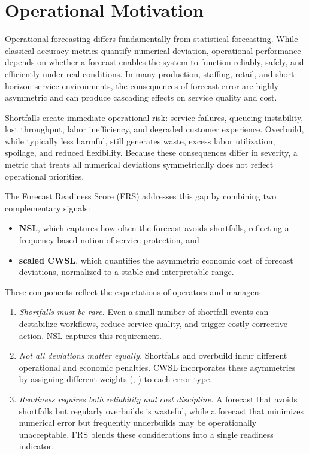 \section{Operational Motivation}

Operational forecasting differs fundamentally from statistical forecasting. While
classical accuracy metrics quantify numerical deviation, operational performance
depends on whether a forecast enables the system to function reliably, safely, and
efficiently under real conditions. In many production, staffing, retail, and
short-horizon service environments, the consequences of forecast error are highly
asymmetric and can produce cascading effects on service quality and cost.

Shortfalls create immediate operational risk: service failures, queueing
instability, lost throughput, labor inefficiency, and degraded customer
experience. Overbuild, while typically less harmful, still generates waste,
excess labor utilization, spoilage, and reduced flexibility. Because these
consequences differ in severity, a metric that treats all numerical deviations
symmetrically does not reflect operational priorities.

The Forecast Readiness Score (FRS) addresses this gap by combining two
complementary signals:

\begin{itemize}
    \item \textbf{NSL}, which captures how often the forecast avoids shortfalls,
    reflecting a frequency-based notion of service protection, and
    \item \textbf{scaled CWSL}, which quantifies the asymmetric economic cost of
    forecast deviations, normalized to a stable and interpretable range.
\end{itemize}

These components reflect the expectations of operators and managers:

\begin{enumerate}
    \item \textit{Shortfalls must be rare.} Even a small number of shortfall
    events can destabilize workflows, reduce service quality, and trigger costly
    corrective action. NSL captures this requirement.

    \item \textit{Not all deviations matter equally.} Shortfalls and overbuild
    incur different operational and economic penalties. CWSL incorporates these
    asymmetries by assigning different weights (\cu, \co) to each error type.

    \item \textit{Readiness requires both reliability and cost discipline.} A
    forecast that avoids shortfalls but regularly overbuilds is wasteful, while a
    forecast that minimizes numerical error but frequently underbuilds may be
    operationally unacceptable. FRS blends these considerations into a single
    readiness indicator.
\end{enumerate}

